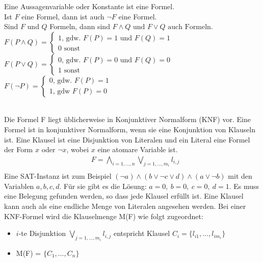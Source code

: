 \documentclass[a4,abstract=on]{scrartcl}
\begin{document}
\begin{mdframed} [linecolor=black,linewidth=2pt]
Eine Aussagenvariable oder Konstante ist eine Formel.\\
Ist $F$ eine Formel, dann ist auch  $\neg F$  eine Formel.\\
Sind $F$ und  $Q$  Formeln, dann sind
$F \wedge Q  \text{ und }  F \vee Q \text{ auch Formeln.}$\\
$F(P\wedge Q) = \begin{cases}1 \text{, gdw. } F(P) = 1 \text{ und } F(Q)=1\\ 0 \text{ sonst}\end{cases}$\\
$F(P\vee Q) = \begin{cases}0 \text{, gdw. } F(P) = 0 \text{ und } F(Q)=0\\ 1 \text{ sonst}\end{cases}$\\
$F(\neg P) = \begin{cases}0 \text{, gdw. } F(P) = 1 \\ 1 \text{, gdw } F(P) = 0\end{cases}$
\end{mdframed}
\ \\
Die Formel F liegt üblicherweise in Konjunktiver Normalform (KNF) vor. Eine Formel ist in konjunktiver Normalform, wenn sie eine Konjunktion von Klauseln ist. Eine Klausel ist eine Disjunktion von Literalen und ein Literal eine Formel der Form $x$ oder $\neg x$, wobei $x$ eine atomare Variable ist.\\
\begin{align*}
&F = \bigwedge_{i=1, \dots ,n} \bigvee_{j=1,\dots ,m_i}{l_{i,j}}\\
\end{align*}
Eine SAT-Instanz ist zum Beispiel $(\neg a) \wedge (b \vee \neg c \vee d) \wedge (a \vee \neg b)$ mit den Variablen $a,b,c,d$. Für sie gibt es die Lösung: $a = 0,{~} b = 0,{~} c= 0, {~} d = 1$. Es muss eine Belegung gefunden werden, so dass jede Klausel erfüllt ist.
Eine Klausel kann auch als eine endliche Menge von Literalen angesehen werden. Bei einer KNF-Formel wird die Klauselmenge M(F) wie folgt zugeordnet:\\
\begin{itemize}
\item $i$-te Disjunktion $\bigvee_{j=1,\dots ,m_i}{l_{i,j}}$ entspricht Klausel $C_i = \{l_{i1}, \dots, l_{im_i}\}$
\item M(F) = $\{C_1, \dots, C_n\}$
\end{itemize}
\end{document}
